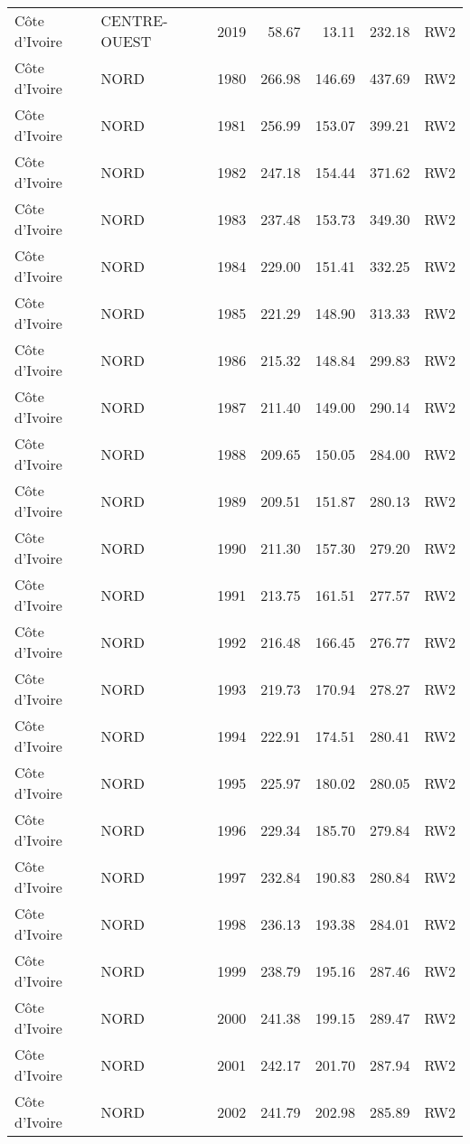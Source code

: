 \begin{longtable}{lllrrrl}
  C\^{o}te d'Ivoire & CENTRE-OUEST & 2019 & 58.67 & 13.11 & 232.18 & RW2 \\ 
  C\^{o}te d'Ivoire & NORD & 1980 & 266.98 & 146.69 & 437.69 & RW2 \\ 
  C\^{o}te d'Ivoire & NORD & 1981 & 256.99 & 153.07 & 399.21 & RW2 \\ 
  C\^{o}te d'Ivoire & NORD & 1982 & 247.18 & 154.44 & 371.62 & RW2 \\ 
  C\^{o}te d'Ivoire & NORD & 1983 & 237.48 & 153.73 & 349.30 & RW2 \\ 
  C\^{o}te d'Ivoire & NORD & 1984 & 229.00 & 151.41 & 332.25 & RW2 \\ 
  C\^{o}te d'Ivoire & NORD & 1985 & 221.29 & 148.90 & 313.33 & RW2 \\ 
  C\^{o}te d'Ivoire & NORD & 1986 & 215.32 & 148.84 & 299.83 & RW2 \\ 
  C\^{o}te d'Ivoire & NORD & 1987 & 211.40 & 149.00 & 290.14 & RW2 \\ 
  C\^{o}te d'Ivoire & NORD & 1988 & 209.65 & 150.05 & 284.00 & RW2 \\ 
  C\^{o}te d'Ivoire & NORD & 1989 & 209.51 & 151.87 & 280.13 & RW2 \\ 
  C\^{o}te d'Ivoire & NORD & 1990 & 211.30 & 157.30 & 279.20 & RW2 \\ 
  C\^{o}te d'Ivoire & NORD & 1991 & 213.75 & 161.51 & 277.57 & RW2 \\ 
  C\^{o}te d'Ivoire & NORD & 1992 & 216.48 & 166.45 & 276.77 & RW2 \\ 
  C\^{o}te d'Ivoire & NORD & 1993 & 219.73 & 170.94 & 278.27 & RW2 \\ 
  C\^{o}te d'Ivoire & NORD & 1994 & 222.91 & 174.51 & 280.41 & RW2 \\ 
  C\^{o}te d'Ivoire & NORD & 1995 & 225.97 & 180.02 & 280.05 & RW2 \\ 
  C\^{o}te d'Ivoire & NORD & 1996 & 229.34 & 185.70 & 279.84 & RW2 \\ 
  C\^{o}te d'Ivoire & NORD & 1997 & 232.84 & 190.83 & 280.84 & RW2 \\ 
  C\^{o}te d'Ivoire & NORD & 1998 & 236.13 & 193.38 & 284.01 & RW2 \\ 
  C\^{o}te d'Ivoire & NORD & 1999 & 238.79 & 195.16 & 287.46 & RW2 \\ 
  C\^{o}te d'Ivoire & NORD & 2000 & 241.38 & 199.15 & 289.47 & RW2 \\ 
  C\^{o}te d'Ivoire & NORD & 2001 & 242.17 & 201.70 & 287.94 & RW2 \\ 
  C\^{o}te d'Ivoire & NORD & 2002 & 241.79 & 202.98 & 285.89 & RW2 \\ 

\end{longtable}
